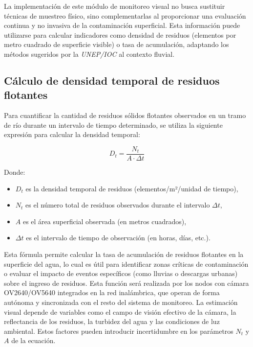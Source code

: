 La implementación de este módulo de monitoreo visual no busca sustituir técnicas de muestreo físico, sino complementarlas al proporcionar una evaluación continua y no invasiva de la contaminación superficial. Esta información puede utilizarse para calcular indicadores como densidad de residuos (elementos por metro cuadrado de superficie visible) o tasa de acumulación, adaptando los métodos sugeridos por la \textit{UNEP/IOC} al contexto fluvial.

\subsection{Cálculo de densidad temporal de residuos flotantes}

Para cuantificar la cantidad de residuos sólidos flotantes observados en un tramo de río durante un intervalo de tiempo determinado, se utiliza la siguiente expresión para calcular la densidad temporal:

\begin{equation}
D_t = \frac{N_t}{A \cdot \Delta t}
\label{eq:densidad_basura_tiempo}
\end{equation}

Donde:
\begin{itemize}
    \item $D_t$ es la densidad temporal de residuos (elementos/m²/unidad de tiempo),
    \item $N_t$ es el número total de residuos observados durante el intervalo $\Delta t$,
    \item $A$ es el área superficial observada (en metros cuadrados),
    \item $\Delta t$ es el intervalo de tiempo de observación (en horas, días, etc.).
\end{itemize}

Esta fórmula permite calcular la tasa de acumulación de residuos flotantes en la superficie del agua, lo cual es útil para identificar zonas críticas de contaminación o evaluar el impacto de eventos específicos (como lluvias o descargas urbanas) sobre el ingreso de residuos. Esta función será realizada por los nodos con cámara OV2640/OV5640 integrados en la red inalámbrica, que operan de forma autónoma y sincronizada con el resto del sistema de monitoreo. La estimación visual depende de variables como el campo de visión efectivo de la cámara, la reflectancia de los residuos, la turbidez del agua y las condiciones de luz ambiental. Estos factores pueden introducir incertidumbre en los parámetros $N_t$ y $A$ de la ecuación.



